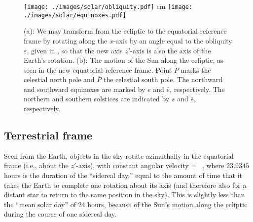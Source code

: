 \begin{figure} [htb]
\begin{center}
	\texttt{[image: ./images/solar/obliquity.pdf]}  cm
	\texttt{[image: ./images/solar/equinoxes.pdf]}
\end{center}
\caption{\small (a): We may transform from the ecliptic to the equatorial reference frame by rotating along the $x$-axis by an angle equal to the obliquity $\varepsilon$, given in , so that the new axis $z'$-axis is also the axis of the Earth's rotation.  (b):  The motion of the Sun along the ecliptic, as seen in the new equatorial reference frame.  Point $P$ marks the celestial north pole and $\overline P$ the celestial south pole.  The northward and southward equinoxes are marked by $e$ and $\bar e$, respectively.  The northern and southern solstices are indicated by $s$ and $\bar s$, respectively.}
\end{figure}

\subsection{Terrestrial frame}

Seen from the Earth, objects in the sky rotate azimuthally in the equatorial frame (i.e., about the $z'$-axis), with constant angular velocity
\be
\omega = ~,
\ee
where $23.9345$ hours is the duration of the ``sidereal day,'' equal to the amount of time that it takes the Earth to complete one rotation about its axis (and therefore also for a distant star to return to the same position in the sky).  This is slightly less than the ``mean solar day'' of 24 hours, because of the Sun's motion along the ecliptic during the course of one sidereal day.

